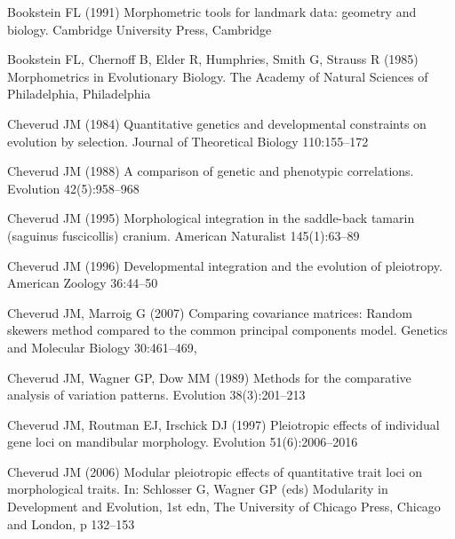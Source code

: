 \documentclass [twocolumn, natbib, nospthms, 10pt] {svjour3}
\begin{document}
\begin{thebibliography}{77}
Bookstein FL (1991) Morphometric tools for landmark data: geometry and biology.
  Cambridge University Press, Cambridge

Bookstein FL, Chernoff B, Elder R, Humphries, Smith G, Strauss R (1985)
  Morphometrics in Evolutionary Biology. The Academy of Natural Sciences of
  Philadelphia, Philadelphia

Cheverud JM (1984) Quantitative genetics and developmental constraints on
  evolution by selection. Journal of Theoretical Biology 110:155–172

Cheverud JM (1988) A comparison of genetic and phenotypic correlations.
  Evolution 42(5):958–968

Cheverud JM (1995) Morphological integration in the saddle-back tamarin
  (saguinus fuscicollis) cranium. American Naturalist 145(1):63–89

Cheverud JM (1996) Developmental integration and the evolution of pleiotropy.
  American Zoology 36:44–50

Cheverud JM, Marroig G (2007) Comparing covariance matrices: Random skewers
  method compared to the common principal components model. Genetics and
  Molecular Biology 30:461–469, 

Cheverud JM, Wagner GP, Dow MM (1989) Methods for the comparative analysis of
  variation patterns. Evolution 38(3):201–213

Cheverud JM, Routman EJ, Irschick DJ (1997) Pleiotropic effects of individual
  gene loci on mandibular morphology. Evolution 51(6):2006–2016

Cheverud JM (2006) Modular pleiotropic effects of quantitative trait loci on
  morphological traits. In: Schlosser G, Wagner GP (eds) Modularity in
  Development and Evolution, 1st edn, The University of Chicago Press, Chicago
  and London, p 132–153


\end{thebibliography}
\end{document}
